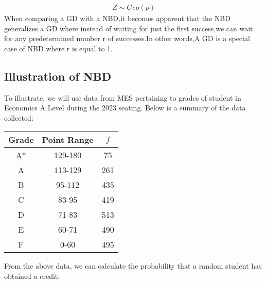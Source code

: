 \documentclass{article}
\begin{document}
\begin{gather*}
  Z \sim Geo(p)
\end{gather*}
When comparing a GD with a NBD,it becomes apparent that the NBD generalizes 
a GD where instead of waiting for just the first success,we can wait for 
any predetermined number r of successes.In other words,A GD is a special
case of NBD where r is equal to 1.

\subsection{Illustration of NBD}
To illustrate, we will use data from MES pertaining
to grades of student in Economics A Level during the 2023 seating.
Below is a summary of the data collected:

\begin{center}
  \begin{tabular}{|c|c|c|}
    \hline
    \textbf{Grade} & \textbf{Point Range} & \textbf{$f$} \\ %
    \hline
    \hline
    A* & 129-180	& 75	\\ %
    A  & 113-129	& 261	\\ %
    B  & 95-112	  & 435	\\ %
    C  & 83-95	  & 419	\\ %
    D  & 71-83	  & 513	\\ %
    E  & 60-71	  & 490	\\ %
    F  & 0-60	    & 495	\\ %
    \hline
  \end{tabular}
\end{center}

From the above data, we can calculate the probability that
a random student has obtained a credit:
\end{document}
